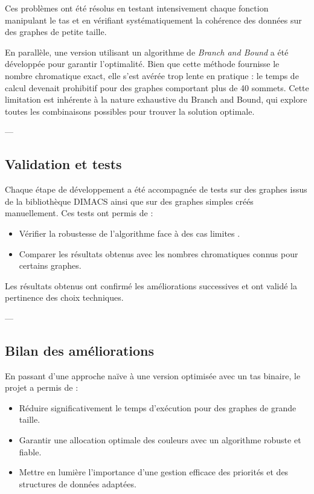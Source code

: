 \documentclass[11pt]{article}
\begin{document}
Ces problèmes ont été résolus en testant intensivement chaque fonction manipulant le tas et en vérifiant systématiquement la cohérence des données sur des graphes de petite taille.

En parallèle, une version utilisant un algorithme de \textit{Branch and Bound} a été développée pour garantir l'optimalité. Bien que cette méthode fournisse le nombre chromatique exact, elle s’est avérée trop lente en pratique : le temps de calcul devenait prohibitif pour des graphes comportant plus de 40 sommets. Cette limitation est inhérente à la nature exhaustive du Branch and Bound, qui explore toutes les combinaisons possibles pour trouver la solution optimale.

---

\subsection{Validation et tests}

Chaque étape de développement a été accompagnée de tests sur des graphes issus de la bibliothèque DIMACS ainsi que sur des graphes simples créés manuellement. Ces tests ont permis de :
\begin{itemize}
    \item Vérifier la robustesse de l’algorithme face à des cas limites .
    \item Comparer les résultats obtenus avec les nombres chromatiques connus pour certains graphes.
\end{itemize}

Les résultats obtenus ont confirmé les améliorations successives et ont validé la pertinence des choix techniques.

---

\subsection{Bilan des améliorations}

En passant d’une approche naïve à une version optimisée avec un tas binaire, le projet a permis de :
\begin{itemize}
    \item Réduire significativement le temps d’exécution pour des graphes de grande taille.
    \item Garantir une allocation optimale des couleurs avec un algorithme robuste et fiable.
    \item Mettre en lumière l’importance d’une gestion efficace des priorités et des structures de données adaptées.
\end{itemize}
\end{document}
